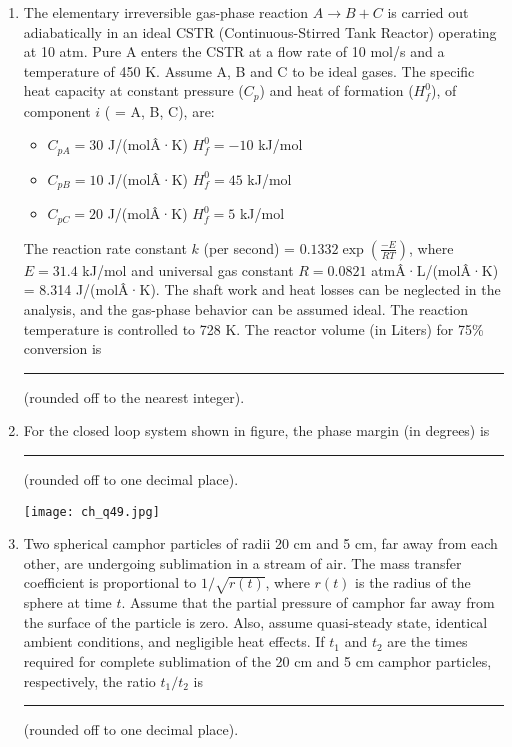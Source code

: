 \documentclass[12pt]{article}
\begin{document}
\begin{enumerate}[label=Q.\arabic*]
		\item The elementary irreversible gas-phase reaction $A \rightarrow B + C$ is carried out adiabatically in an ideal CSTR (Continuous-Stirred Tank Reactor) operating at 10 atm. Pure A enters the CSTR at a flow rate of 10 mol/s and a temperature of 450 K. Assume A, B and C to be ideal gases. The specific heat capacity at constant pressure ($C_p$) and heat of formation ($H_f^0$), of component $i$ ( = A, B, C), are:

			\begin{itemize}
				\item $C_{pA} = 30$ J/(molÂ·K) \quad $H_f^0 = -10$ kJ/mol\\
				\item $C_{pB} = 10$ J/(molÂ·K) \quad $H_f^0 = 45$ kJ/mol\\
				\item $C_{pC} = 20$ J/(molÂ·K) \quad $H_f^0 = 5$ kJ/mol\\
			\end{itemize}

			The reaction rate constant $k$ (per second) = $0.1332\exp\left(\frac{-E}{RT}\right)$, where $E = 31.4$ kJ/mol and universal gas constant $R = 0.0821$ atmÂ·L/(molÂ·K) = 8.314 J/(molÂ·K). The shaft work and heat losses can be neglected in the analysis, and the gas-phase behavior can be assumed ideal. The reaction temperature is controlled to 728 K. The reactor volume (in Liters) for 75\% conversion is \rule{3cm}{0.15mm} (rounded off to the nearest integer).

		\item For the closed loop system shown in figure, the phase margin (in degrees) is \rule{3cm}{0.15mm} (rounded off to one decimal place).

			\begin{center}{
					\texttt{[image: ch\_q49.jpg]}
			}\end{center}

		\item Two spherical camphor particles of radii 20 cm and 5 cm, far away from each other, are undergoing sublimation in a stream of air. The mass transfer coefficient is proportional to $1/\sqrt{r(t)}$, where $r(t)$ is the radius of the sphere at time $t$. Assume that the partial pressure of camphor far away from the surface of the particle is zero. Also, assume quasi-steady state, identical ambient conditions, and negligible heat effects. If $t_1$ and $t_2$ are the times required for complete sublimation of the 20 cm and 5 cm camphor particles, respectively, the ratio $t_1/t_2$ is \rule{3cm}{0.15mm} (rounded off to one decimal place).


\end{enumerate}
\end{document}
